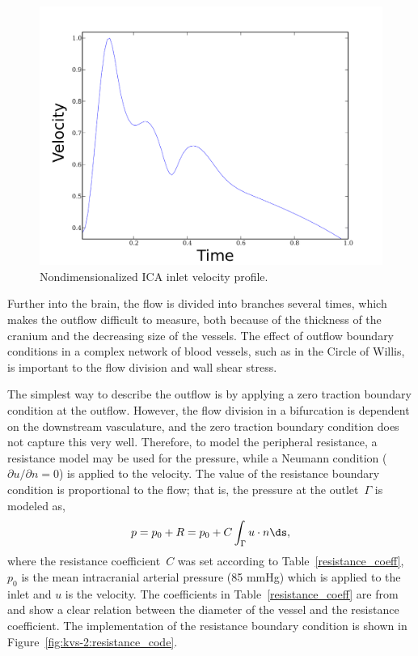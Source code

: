 \begin{figure}
  \center\includegraphics[width=\largefig]{chapters/kvs-2/pdf/systolic.pdf}
   \caption{Nondimensionalized ICA inlet velocity profile.}
\label{fig:kvs-2:ford}
\end{figure}

Further into the brain, the flow is divided into branches several
times, which makes the outflow difficult to measure, both because of
the thickness of the cranium and the decreasing size of the vessels.
The effect of outflow boundary conditions in a complex network of
blood vessels, such as in the Circle of Willis, is important to the
flow division and wall shear stress.

The simplest way to describe the outflow is by applying a zero
traction boundary condition at the outflow. However, the flow division
in a bifurcation is dependent on the downstream vasculature, and the
zero traction boundary condition does not capture this very
well. Therefore, to model the peripheral resistance, a resistance
model may be used for the pressure, while a Neumann condition
(${\partial u / \partial n} = 0 $) is applied to the velocity. The
value of the resistance boundary condition is proportional to the
flow; that is, the pressure at the outlet~$\Gamma$ is modeled as,
\begin{equation} \label{kvs-2:eq:resistancebc}
  p = p_0 + R = p_0 + C \int_\Gamma u \cdot n \ds,
\end{equation}
where the resistance coefficient~$C$ was set according to
Table~\ref{resistance_coeff}, $p_0$ is the mean intracranial arterial
pressure (85 mmHg) which is applied to the inlet and $u$ is the
velocity. The coefficients in Table~\ref{resistance_coeff} are
from \citet{AlastrueyParkerPeiroEtAl2007} and show a clear relation
between the diameter of the vessel and the resistance coefficient. The
implementation of the resistance boundary condition is shown in
Figure~\ref{fig:kvs-2:resistance_code}.

